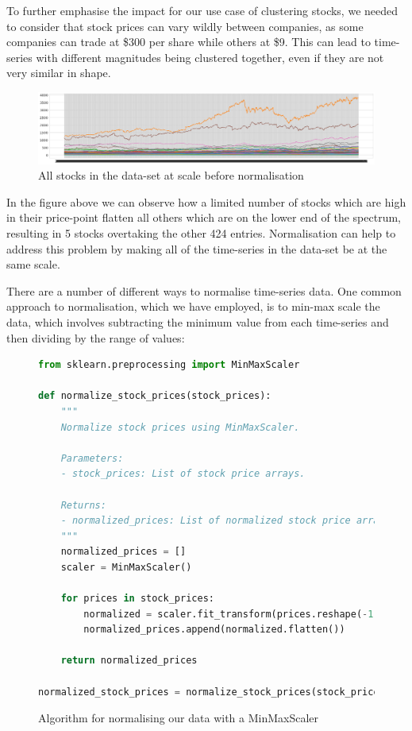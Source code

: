 \documentclass[11pt]{article}
\begin{document}
To further emphasise the impact for our use case of clustering stocks, we needed to consider that stock prices can vary wildly between companies, as some companies can trade at \$300 per share while others at \$9. This can lead to time-series with different magnitudes being clustered together, even if they are not very similar in shape. 

\begin{figure}[H]
\centering
\includegraphics[width=12cm]{img/all-stocks.png} 
\caption{All stocks in the data-set at scale before normalisation}
\label{fig:prenorm}
\end{figure}

In the figure above we can observe how a limited number of stocks which are high in their price-point flatten all others which are on the lower end of the spectrum, resulting in 5 stocks overtaking the other 424 entries. Normalisation can help to address this problem by making all of the time-series in the data-set be at the same scale. 

There are a number of different ways to normalise time-series data. One common approach to normalisation, which we have employed, is to min-max scale the data, which involves subtracting the minimum value from each time-series and then dividing by the range of values: 

\begin{figure}[H]
\centering

\begin{lstlisting}[language=Python]
from sklearn.preprocessing import MinMaxScaler

def normalize_stock_prices(stock_prices):
    """
    Normalize stock prices using MinMaxScaler.

    Parameters:
    - stock_prices: List of stock price arrays.

    Returns:
    - normalized_prices: List of normalized stock price arrays.
    """
    normalized_prices = []
    scaler = MinMaxScaler()

    for prices in stock_prices:
        normalized = scaler.fit_transform(prices.reshape(-1, 1))
        normalized_prices.append(normalized.flatten())

    return normalized_prices

normalized_stock_prices = normalize_stock_prices(stock_prices)
\end{lstlisting}

\caption{Algorithm for normalising our data with a MinMaxScaler}
\end{figure}
\end{document}

